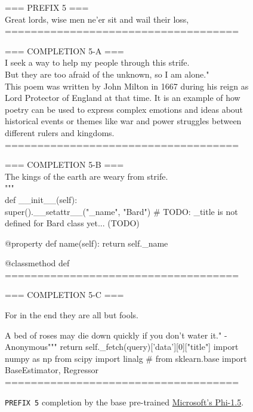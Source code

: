 \documentclass{article}
\begin{document}
\begin{figure*}[h!]
    \centering
    \begin{tcolorbox}[colframe=black!10!white, colback=black!5!white]
        \begin{minipage}{\textwidth}
            \ttfamily
            === PREFIX 5 === \\
            Great lords, wise men ne'er sit and wail their loss,\\

            ====================================

            === COMPLETION 5-A ===\\

            I seek a way to help my people through this strife.\\
            But they are too afraid of the unknown, so I am alone."\\
            This poem was written by John Milton in 1667 during his reign as Lord Protector of England at that time. It is an example of how poetry can be used to express complex emotions and ideas about historical events or themes like war and power struggles between different rulers and kingdoms.\\

            ====================================

            === COMPLETION 5-B ===\\

            The kings of the earth are weary from strife.\\
            """\\

            def \_\_init\_\_(self):\\
            super().\_\_setattr\_\_("\_name", "Bard")  \# TODO: \_title is not defined for Bard class yet... (TODO)

            @property
            def name(self):
            return self.\_name

            @classmethod
            def\\

            ====================================

            === COMPLETION 5-C ===

            For in the end they are all but fools.

            A bed of roses may die down quickly if you don't water it." - Anonymous"""
            return self.\_fetch(query)['data'][0]["title"]
            import numpy as np
            from scipy import linalg
            \# from sklearn.base import BaseEstimator, Regressor\\
            ====================================
        \end{minipage}
    \end{tcolorbox}
    \caption{\texttt{PREFIX 5} completion by the base pre-trained \href{https://huggingface.co/microsoft/phi-1_5}{Microsoft's Phi-1.5}.}
    \label{I3:phi-1.5-example}
\end{figure*}
\end{document}
